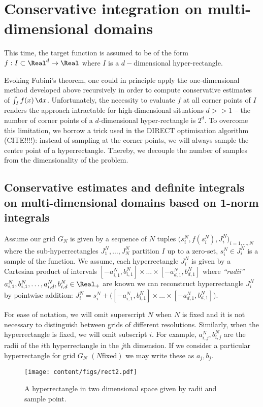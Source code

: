 \section{Conservative integration on multi-dimensional domains}
This time, the target function is assumed to be of the form $f: I \subset \Real^d \to \Real$ where $I$ is a $d-$dimensional hyper-rectangle.

Evoking Fubini's theorem, one could in principle apply the one-dimensional method developed above recursively in order to compute conservative estimates of $\int_I f(x) \, \d x$. Unfortunately, the necessity to evaluate $f$ at all corner points of $I$ renders the approach intractable for high-dimensional situations $d>>1$ -- the number of corner points of a $d$-dimensional hyper-rectangle is $2^d$. 
To overcome this limitation, we borrow a trick used in the DIRECT optimisation algorithm (CITE!!!!): instead of sampling at the corner points, we will always sample the centre point of a hyperrectangle. Thereby, we decouple the number of samples from the dimensionality of the problem.

\subsection{Conservative estimates and definite integrals on multi-dimensional domains based on 1-norm integrals}
Assume our grid $G_N$ is given by a sequence of $N$ tuples $\bigl(s_{i}^N, f(s_{i}^N), J_{i}^N\bigr)_{i=1,\ldots,N}$ where the sub-hyperrectangles $J_{1}^N,\ldots, J_{N}^N$ partition $I$ up to a zero-set, $s_i^N \in J^N_i$ is a sample of the function. We assume, each hyperrectangle $J_{i}^N$ is given by a Cartesian product of intervals $[-a_{i,1}^N,b_{i,1}^N] \times \ldots \times [-a_{d,1}^N,b_{d,1}^N]$ where \emph{``radii''} $a_{i,1}^N,b_{i,1}^N,\ldots, a_{i,d}^N,b_{i,d}^N\in \Real_+$ are known we can reconstruct hyperrectangle $J^N_i$ by pointwise addition: $J^N_i= s_i^N + \bigl( [-a_{i,1}^N,b_{i,1}^N] \times \ldots \times [-a_{d,1}^N,b_{d,1}^N] \bigr)$. 


For ease of notation, we will omit superscript $N$ when $N$ is fixed and it is not necessary to distinguish between 
grids of different resolutions. Similarly, when the hyperrectangle is fixed, we will omit subscript $i$. For example, $a_{i,j}^N , b_{i,j}^N$ are the radii of the $i$th hyperrectangle in the $j$th dimension. If we consider a particular hyperrectangle for grid $G_N$ $(N \text{fixed})$ we may write these as $a_j,b_j$.

\begin{figure}[htbp]
			\centering
			\texttt{[image: content/figs/rect2.pdf]}
	\caption{A hyperrectangle in two dimensional space given by radii and sample point.}
	\label{fig:rect2}
\end{figure}


